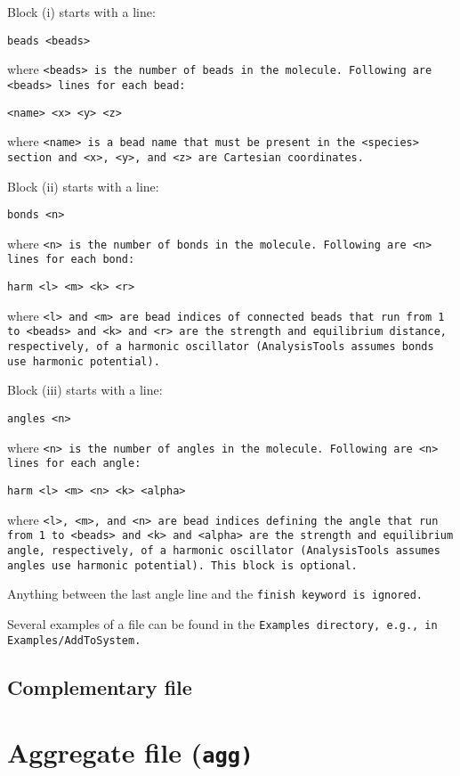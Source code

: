 Block (i) starts with a line:
\begin{verbatim}beads <beads>\end{verbatim}
where \tt{<beads>} is the number of beads in the molecule. Following are
\tt{<beads>} lines for each bead:
\begin{verbatim}<name> <x> <y> <z>\end{verbatim}
where \tt{<name>} is a bead name that must be present in the \tt{<species>}
section and \tt{<x>}, \tt{<y>}, and \tt{<z>} are Cartesian coordinates.

Block (ii) starts with a line:
\begin{verbatim}bonds <n>\end{verbatim}
where \tt{<n>} is the number of bonds in the molecule. Following are
\tt{<n>} lines for each bond:
\begin{verbatim}harm <l> <m> <k> <r>\end{verbatim}
where \tt{<l>} and \tt{<m>} are bead indices of connected beads that run
from 1 to \tt{<beads>} and \tt{<k>} and \tt{<r>} are the strength and
equilibrium distance, respectively, of a harmonic oscillator (AnalysisTools
assumes bonds use harmonic potential).

Block (iii) starts with a line:
\begin{verbatim}angles <n>\end{verbatim}
where \tt{<n>} is the number of angles in the molecule. Following are
\tt{<n>} lines for each angle:
\begin{verbatim}harm <l> <m> <n> <k> <alpha>\end{verbatim}
where \tt{<l>}, \tt{<m>}, and \tt{<n>} are bead indices defining the angle
that run from 1 to \tt{<beads>} and \tt{<k>} and \tt{<alpha>} are the
strength and equilibrium angle, respectively, of a harmonic oscillator
(AnalysisTools assumes angles use harmonic potential). This block is optional.

Anything between the last angle line and the \tt{finish} keyword is ignored.

Several examples of a \field file can be found in the \tt{Examples}
directory, e.g., in \tt{Examples/AddToSystem}. %

\subsection{Complementary \data file} %

\section{Aggregate file (\tt{agg})} \label{ssec:AggFile} %

